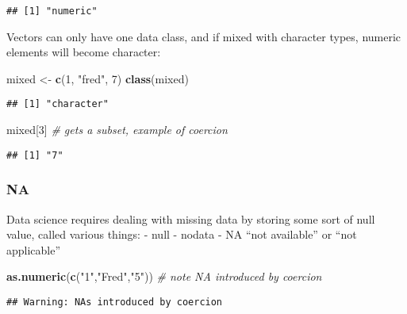 \documentclass[
]{book}
\newenvironment{Shaded}{\begin{snugshade}}{\end{snugshade}}
\newcommand{\CommentTok}[1]{\textcolor[rgb]{0.56,0.35,0.01}{\textit{#1}}}
\newcommand{\DecValTok}[1]{\textcolor[rgb]{0.00,0.00,0.81}{#1}}
\newcommand{\KeywordTok}[1]{\textcolor[rgb]{0.13,0.29,0.53}{\textbf{#1}}}
\newcommand{\NormalTok}[1]{#1}
\newcommand{\StringTok}[1]{\textcolor[rgb]{0.31,0.60,0.02}{#1}}
\begin{document}
\begin{verbatim}
## [1] "numeric"
\end{verbatim}

Vectors can only have one data class, and if mixed with character types, numeric elements will become character:

\begin{Shaded}
\begin{Highlighting}[]
\NormalTok{mixed <-}\StringTok{ }\KeywordTok{c}\NormalTok{(}\DecValTok{1}\NormalTok{, }\StringTok{"fred"}\NormalTok{, }\DecValTok{7}\NormalTok{)}
\KeywordTok{class}\NormalTok{(mixed)}
\end{Highlighting}
\end{Shaded}

\begin{verbatim}
## [1] "character"
\end{verbatim}

\begin{Shaded}
\begin{Highlighting}[]
\NormalTok{mixed[}\DecValTok{3}\NormalTok{]   }\CommentTok{# gets a subset, example of coercion}
\end{Highlighting}
\end{Shaded}

\begin{verbatim}
## [1] "7"
\end{verbatim}

\hypertarget{na}{%
\subsubsection{NA}\label{na}}

Data science requires dealing with missing data by storing some sort of null value, called various things:
- null
- nodata
- NA ``not available'' or ``not applicable''

\begin{Shaded}
\begin{Highlighting}[]
\KeywordTok{as.numeric}\NormalTok{(}\KeywordTok{c}\NormalTok{(}\StringTok{"1"}\NormalTok{,}\StringTok{"Fred"}\NormalTok{,}\StringTok{"5"}\NormalTok{)) }\CommentTok{# note NA introduced by coercion}
\end{Highlighting}
\end{Shaded}

\begin{verbatim}
## Warning: NAs introduced by coercion
\end{verbatim}
\end{document}
